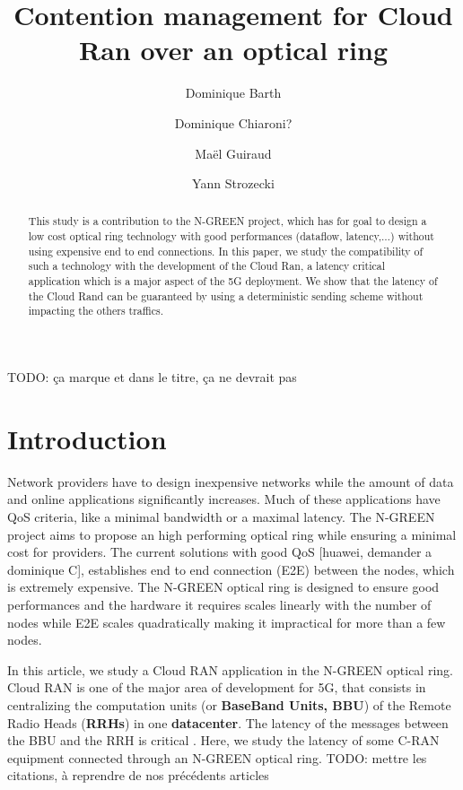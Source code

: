 \documentclass[]{algotel}
\title{Contention management for Cloud Ran over an optical ring}
\author{Dominique Barth\addressmark{1}
  \and Dominique Chiaroni?\addressmark{2}
  \and Ma\"el Guiraud \addressmark{1,2}
   \and Yann Strozecki \addressmark{1}
  }
\newcommand{\todo}[1]{{\color{red} TODO: {#1}}}
\begin{document}
\maketitle


\begin{abstract}

This study is a contribution to the N-GREEN project, which has for goal to design a low cost optical ring technology with good performances (dataflow, latency,$\dots$) without using expensive end to end connections. In this paper, we study the compatibility of such a technology with the development of the Cloud Ran, a latency critical application which is a major aspect of the 5G deployment. We show that the latency of the Cloud Rand can be guaranteed by using a deterministic sending scheme without impacting the others traffics. 
\end{abstract}

\todo{ça marque et dans le titre, ça ne devrait pas}


\section{Introduction}

Network providers have to design inexpensive networks while the amount of data and online applications significantly increases. Much of these applications have QoS criteria, like a minimal bandwidth or a maximal latency. The N-GREEN project aims to propose an high performing optical ring while ensuring a minimal cost for providers. The current solutions with good QoS [huawei, demander a dominique C], establishes end to end connection (E2E) between the nodes, which is extremely expensive. The N-GREEN optical ring is designed to ensure good performances and the hardware it requires scales linearly with the number of nodes while E2E scales quadratically making it impractical for more than a few nodes.

In this article, we study a Cloud RAN application in the N-GREEN optical ring. Cloud RAN is one of the major area of development for 5G, that consists in centralizing the computation units (or {\bf BaseBand Units, BBU}) of the Remote Radio Heads ({\bf RRHs}) in one {\bf datacenter}. The latency of the messages between the BBU and the RRH is critical \cite{}. Here, we study the latency of some C-RAN equipment connected through an N-GREEN optical ring.\todo{mettre les citations, à reprendre de nos précédents articles}
\end{document}
